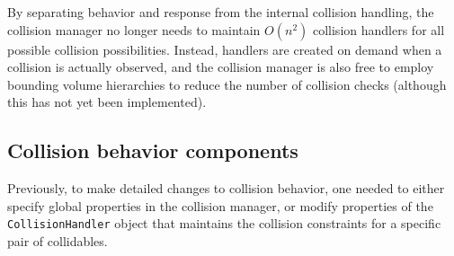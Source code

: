 \documentclass{article}
\begin{document}
By separating behavior and response from the internal collision
handling, the collision manager no longer needs to maintain $O(n^2)$
collision handlers for all possible collision possibilities.  Instead,
handlers are created on demand when a collision is actually observed,
and the collision manager is also free to employ bounding volume
hierarchies to reduce the number of collision checks (although this 
has not yet been implemented).

\subsection*{Collision behavior components}

Previously, to make detailed changes to collision behavior, one needed
to either specify global properties in the collision manager, or
modify properties of the {\tt CollisionHandler} object that maintains
the collision constraints for a specific pair of collidables.
\end{document}
